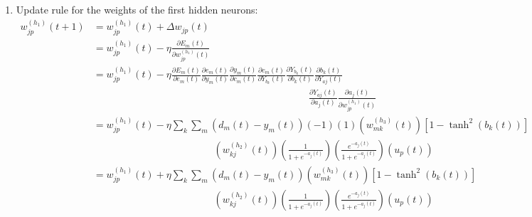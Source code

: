 \documentclass[12pt,a4paper]{article}
\begin{document}
\begin{CJK}{UTF8}{bsmi}
\begin{enumerate}
\begin{enumerate}
\item Update rule for the weights of the first hidden neurons:
\vspace{0.5cm}
\\
$
\begin{aligned}
w_{jp}^{(h_1)}(t+1) & =w_{jp}^{(h_1)}(t)+\Delta w_{jp}(t)
\\[0.5cm]
& =w_{jp}^{(h_1)}(t)-\eta\frac{\partial E_m(t)}{\partial w_{jp}^{(h_1)}(t)}
\\[0.5cm]
& = w_{jp}^{(h_1)}(t)-\eta\frac{\partial E_m(t)}{\partial e_{m}(t)}
\frac{\partial e_{m}(t)}{\partial y_m(t)}
\frac{\partial y_m(t)}{\partial c_{m}(t)}
\frac{\partial c_m(t)}{\partial Y_{b_k}(t)}
\frac{\partial Y_{b_k}(t)}{\partial b_k(t)}
\frac{\partial b_k(t)}{\partial Y_{aj}(t)}
\\[0.5cm]
&\ \hspace{9cm}
\frac{\partial Y_{aj}(t)}{\partial a_j(t)}
\frac{\partial a_{j}(t)}{\partial w_{jp}^{(h_1)}(t)}
\\[0.5cm]
& = w_{jp}^{(h_1)}(t)-\eta\sum_k\sum_m(d_m(t)-y_m(t))(-1)(1)(w_{mk}^{(h_3)}(t))
[1-\tanh^2(b_k(t))]
\\[0.5cm]
&\ \hspace{5cm}
(w_{kj}^{(h_2)}(t))(\frac{1}{1+ e^{-a_j(t)}})
(\frac{e^{-a_j(t)}}{1+ e^{-a_j(t)}})(u_p(t))
\\[0.5cm]
& = w_{jp}^{(h_1)}(t)+\eta\sum_k\sum_m(d_m(t)-y_m(t))(w_{mk}^{(h_3)}(t))
[1-\tanh^2(b_k(t))]
\\[0.5cm]
&\ \hspace{5cm}
(w_{kj}^{(h_2)}(t))(\frac{1}{1+ e^{-a_j(t)}})
(\frac{e^{-a_j(t)}}{1+ e^{-a_j(t)}})(u_p(t))
\end{aligned}
$


\end{enumerate}
\end{enumerate}
\end{CJK}
\end{document}
